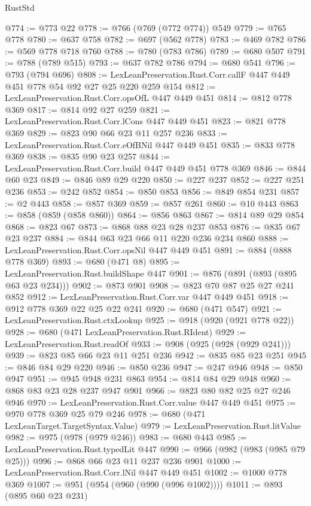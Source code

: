 \begin{lexlean}{RustStd}
\begin{coremodule}
{\begin{coremodule}
{{{{{{@774 := @773 @22
@778 := @766 (@769 (@772 @774)) @549
@779 := @765 @778
@780 := @637 @758
@782 := @697 (@562 @778)
@783 := @469 @782
@786 := @569 @778 @718 @760
@788 := @780 (@783 @786)
@789 := @680 @507
@791 := @788 (@789 @515)
@793 := @637 @782 @786
@794 := @680 @541
@796 := @793 (@794 @696)
@808 := LexLeanPreservation.Rust.Corr.callF @447 @449 @451 @778 @54 @92 @27 @25 @220 @259 @154
@812 := LexLeanPreservation.Rust.Corr.opsOfL @447 @449 @451
@814 := @812 @778 @369
@817 := @814 @92 @27 @259
@821 := LexLeanPreservation.Rust.Corr.lCons @447 @449 @451
@823 := @821 @778 @369
@829 := @823 @90 @66 @23 @11 @257 @236
@833 := LexLeanPreservation.Rust.Corr.eOfBNil @447 @449 @451
@835 := @833 @778 @369
@838 := @835 @90 @23 @257
@844 := LexLeanPreservation.Rust.Corr.build @447 @449 @451 @778 @369
@846 := @844 @60 @23
@849 := @846 @89 @29 @220
@850 := @227 @237
@852 := @227 @251 @236
@853 := @242 @852
@854 := @850 @853
@856 := @849 @854 @231
@857 := @2 @443
@858 := @857 @369
@859 := @857 @261
@860 := @10 @443
@863 := @858 (@859 (@858 @860))
@864 := @856 @863
@867 := @814 @89 @29 @854
@868 := @823 @67
@873 := @868 @88 @23 @28 @237 @853
@876 := @835 @67 @23 @237
@884 := @844 @63 @23 @66 @11 @220 @236 @234 @860
@888 := LexLeanPreservation.Rust.Corr.opsNil @447 @449 @451
@891 := @884 (@888 @778 @369)
@893 := @680 (@471 @8)
@895 := LexLeanPreservation.Rust.buildShape @447
@901 := @876 (@891 (@893 (@895 @63 @23 @234)))
@902 := @873 @901
@908 := @823 @70 @87 @25 @27 @241 @852
@912 := LexLeanPreservation.Rust.Corr.var @447 @449 @451
@918 := @912 @778 @369 @22 @25 @22 @241
@920 := @680 (@471 @547)
@921 := LexLeanPreservation.Rust.ctxLookup
@925 := @918 (@920 (@921 @778 @22))
@928 := @680 (@471 LexLeanPreservation.Rust.RIdent)
@929 := LexLeanPreservation.Rust.readOf
@933 := @908 (@925 (@928 (@929 @241)))
@939 := @823 @85 @66 @23 @11 @251 @236
@942 := @835 @85 @23 @251
@945 := @846 @84 @29 @220
@946 := @850 @236
@947 := @247 @946
@948 := @850 @947
@951 := @945 @948 @231 @863
@954 := @814 @84 @29 @948
@960 := @868 @83 @23 @28 @237 @947 @901
@966 := @823 @80 @82 @25 @27 @246 @946
@970 := LexLeanPreservation.Rust.Corr.value @447 @449 @451
@975 := @970 @778 @369 @25 @79 @246
@978 := @680 (@471 LexLeanTarget.TargetSyntax.Value)
@979 := LexLeanPreservation.Rust.litValue
@982 := @975 (@978 (@979 @246))
@983 := @680 @443
@985 := LexLeanPreservation.Rust.typedLit @447
@990 := @966 (@982 (@983 (@985 @79 @25)))
@996 := @868 @66 @23 @11 @237 @236 @901
@1000 := LexLeanPreservation.Rust.Corr.lNil @447 @449 @451
@1002 := @1000 @778 @369
@1007 := @951 (@954 (@960 (@990 (@996 @1002))))
@1011 := @893 (@895 @60 @23 @231)
}}}}}}
\end{coremodule}}
\end{coremodule}
\end{lexlean}
